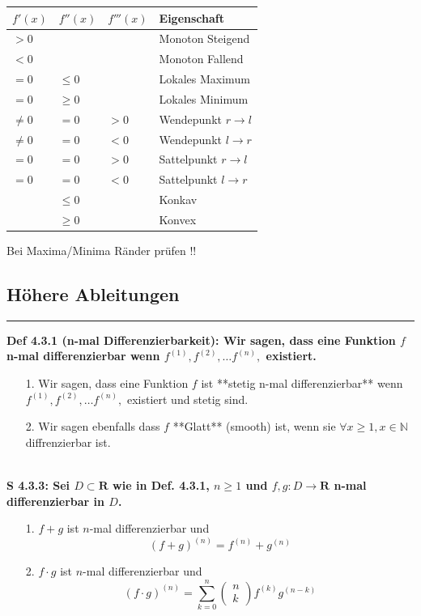 \documentclass[7pt,landscape, margin = 0.1mm]{article}
\newcommand*{\mysubsection}[1]{\vspace{-2mm}\color{chaptercolor}\subsection{ #1 }
\vspace{-1mm}\hrule\vspace{1.5mm}\color{black}
\vspace{2mm}}
\newcommand{\DEF}[2]{\color{chaptercolor}\bf{Def #1}:\color{black}    \hspace{0.2cm} #2 \\}
\newcommand{\SA}[2]{\color{chaptercolor}\bf{S #1}:\color{black}    \hspace{0.2cm} #2 \\}
\begin{document}
\begin{multicols}{4}
\begin{flushleft}
{\begin{center}
\begin{tabular}{|l|l|l|l|}
\hline
$f'(x)$  & $f''(x)$ & $f'''(x)$ & Eigenschaft             \\ \hline
$> 0$    &          &           & Monoton Steigend \\ \hline
$< 0$    &          &           & Monoton Fallend  \\ \hline
$=0$     & $\leq 0$    &           & Lokales Maximum         \\ \hline
$=0$     & $\geq 0$    &           & Lokales Minimum         \\ \hline
$\neq 0$ & $=0$     & $> 0$     & Wendepunkt $r \to l$    \\ \hline
$\neq 0$ & $=0$     & $< 0$     & Wendepunkt $l \to r$    \\ \hline
$=0$     & $=0$     & $> 0$     & Sattelpunkt $r \to l$   \\ \hline
$=0$     & $=0$     & $< 0$     & Sattelpunkt $l \to r$   \\ \hline
         & $\leq 0$    &           & Konkav          \\ \hline
         & $\geq 0$    &           & Konvex            \\ \hline
\end{tabular}

\end{center}

 \colorbox{yellow!30}{Bei Maxima/Minima Ränder prüfen !!} 
}


\mysubsection{Höhere Ableitungen}
\DEF{4.3.1 (n-mal Differenzierbarkeit)}{Wir sagen, dass eine Funktion $f$ n-mal differenzierbar wenn $f^{(1)}, f^{(2)}, \ldots f^{(n)},$ existiert.
\begin{itemize}


\item[1.] Wir sagen, dass eine Funktion $f$ ist **stetig n-mal differenzierbar** wenn $f^{(1)}, f^{(2)}, \ldots f^{(n)},$ existiert und stetig sind.
\item[2.] Wir sagen ebenfalls dass $f$ **Glatt** (smooth) ist, wenn sie $\forall x \geq 1, x \in \mathbb{N}$ diffrenzierbar ist.\end{itemize}}
\SA{4.3.3}{ Sei $D \subset \mathbf{R}$ wie in Def. 4.3.1, $n \geqslant 1$ und $f, g: D \longrightarrow \mathbf{R}$ n-mal differenzierbar in $D$.
\begin{itemize}


\item[1.] $f+g$ ist $n$-mal differenzierbar und $$ (f+g)^{(n)}=f^{(n)}+g^{(n)} $$
\item[2.] $f \cdot g$ ist $n$-mal differenzierbar und $$ (f \cdot g)^{(n)}=\sum_{k=0}^n\left(\begin{array}{l} n \\ k \end{array}\right) f^{(k)} g^{(n-k)} $$\end{itemize}}


\end{flushleft}
\end{multicols}
\end{document}
